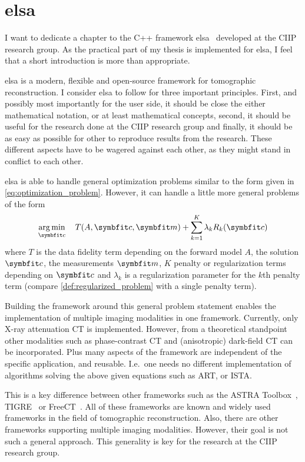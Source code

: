 \chapter{elsa}\label{chap:elsa}

I want to dedicate a chapter to the C++ framework elsa~\cite{lasser_elsa_2019} developed at the
\gls{CIIP} research group. As the practical part of my thesis is implemented for elsa, I feel that a
short introduction is more than appropriate.

elsa is a modern, flexible and open-source framework for tomographic reconstruction. I consider elsa
to follow for three important principles. First, and possibly most importantly for the user side, it
should be close the either mathematical notation, or at least mathematical concepts, second, it
should be useful for the research done at the \gls{CIIP} research group and finally, it should be as
easy as possible for other to reproduce results from the research. These different aspects have to
be wagered against each other, as they might stand in conflict to each other.

elsa is able to handle general optimization problems similar to the form given in
\autoref{eq:optimization_problem}. However, it can handle a little more general problems of the form
\begin{equation}\label{eq:complex_optimization_problem}
	\argmin_{\mvec{c}} \quad T(A, \mvec{c}, \mvec{m}) + \sum_{k=1}^K \lambda_k R_k(\mvec{c})
\end{equation}
where \(T\) is the data fidelity term depending on the forward model \(A\), the solution
\(\mvec{c}\), the measurements \(\mvec{m}\), \(K\) penalty or regularization terms depending on
\(\mvec{c}\) and \(\lambda_k\) is a regularization parameter for the \(k\)th penalty term (compare
\autoref{def:regularized_problem} with a single penalty term).

Building the framework around this general problem statement enables the implementation of multiple
imaging modalities in one framework. Currently, only X-ray attenuation CT is implemented. However,
from a theoretical standpoint other modalities such as phase-contrast CT and (anisotropic) dark-field
CT can be incorporated. Plus many aspects of the framework are independent of the specific
application, and reusable. I.e.\ one needs no different implementation of algorithms solving the
above given equations such as \gls{ART}, or \gls{ISTA}\@.

This is a key difference between other frameworks such as the ASTRA
Toolbox~\cite{van_aarle_fast_2016}, TIGRE~\cite{biguri_tigre_2016} or
FreeCT~\cite{hoffman_technical_2016}. All of these frameworks are known and widely used frameworks in
the field of tomographic reconstruction. Also, there are other frameworks supporting multiple
imaging modalities. However, their goal is not such a general approach. This generality is key for
the research at the \gls{CIIP} research group.

